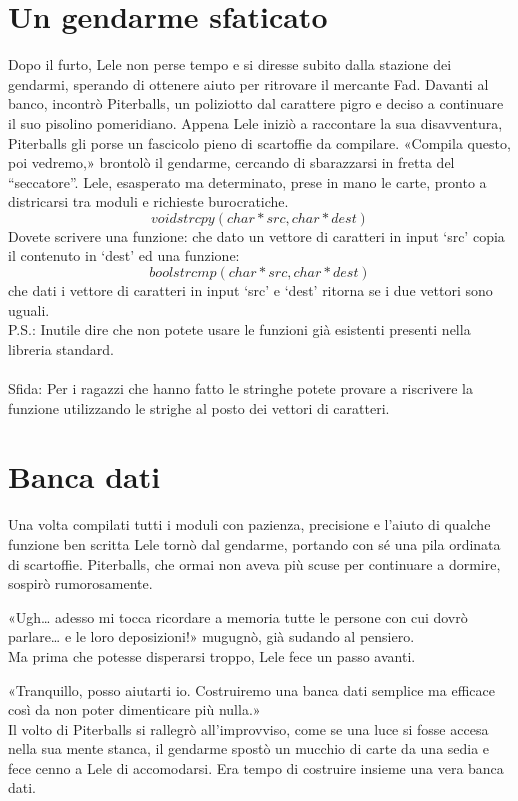 \documentclass[a4paper]{article}
\begin{document}
\section*{Un gendarme sfaticato}
Dopo il furto, Lele non perse tempo e si diresse subito dalla stazione dei gendarmi, sperando di ottenere aiuto per ritrovare il mercante Fad.
Davanti al banco, incontrò Piterballs, un poliziotto dal carattere pigro e deciso a continuare il suo pisolino pomeridiano. Appena Lele iniziò a raccontare la sua disavventura, Piterballs gli porse un fascicolo pieno di scartoffie da compilare.
«Compila questo, poi vedremo,» brontolò il gendarme, cercando di sbarazzarsi in fretta del “seccatore”.
Lele, esasperato ma determinato, prese in mano le carte, pronto a districarsi tra moduli e richieste burocratiche.
\begin{equation*}void strcpy(char *src, char *dest)\end{equation*}
Dovete scrivere una funzione:  che dato un vettore di caratteri in input `src' copia il contenuto in `dest' ed una funzione: \begin{equation*}bool strcmp(char *src, char *dest)\end{equation*} che dati i vettore di caratteri in input `src' e `dest' ritorna se i due vettori sono uguali.\\
P.S.: Inutile dire che non potete usare le funzioni già esistenti presenti nella libreria standard.\\
\\
Sfida: Per i ragazzi che hanno fatto le stringhe potete provare a riscrivere la funzione utilizzando le strighe al posto dei vettori di caratteri.

\section*{Banca dati}
Una volta compilati tutti i moduli con pazienza, precisione e l'aiuto di qualche funzione ben scritta Lele tornò dal gendarme, portando con sé una pila ordinata di scartoffie.
Piterballs, che ormai non aveva più scuse per continuare a dormire, sospirò rumorosamente.

«Ugh… adesso mi tocca ricordare a memoria tutte le persone con cui dovrò parlare… e le loro deposizioni!» mugugnò, già sudando al pensiero.\\
Ma prima che potesse disperarsi troppo, Lele fece un passo avanti.

«Tranquillo, posso aiutarti io. Costruiremo una banca dati semplice ma efficace così da non poter dimenticare più nulla.»\\
Il volto di Piterballs si rallegrò all'improvviso, come se una luce si fosse accesa nella sua mente stanca, il gendarme spostò un mucchio di carte da una sedia e fece cenno a Lele di accomodarsi.
Era tempo di costruire insieme una vera banca dati.
\end{document}
